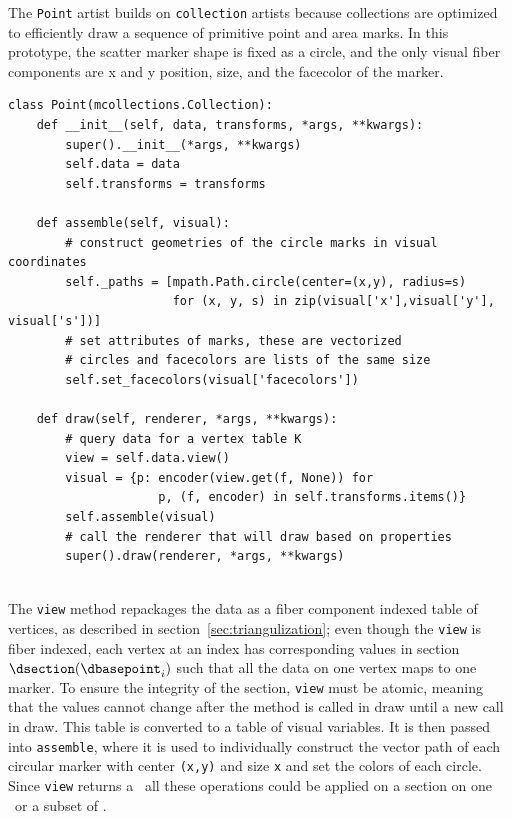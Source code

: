 \documentclass[../main.tex]{subfiles}
\begin{document}
The \texttt{Point} artist builds on \texttt{collection} artists because collections are optimized to efficiently draw a sequence of primitive point and area marks. In this prototype, the scatter marker shape is fixed as a circle, and the only visual fiber components are x and y position, size, and the facecolor of the marker. 
\begin{verbatim}
class Point(mcollections.Collection):
    def __init__(self, data, transforms, *args, **kwargs):
        super().__init__(*args, **kwargs)
        self.data = data
        self.transforms = transforms

    def assemble(self, visual):
        # construct geometries of the circle marks in visual coordinates
        self._paths = [mpath.Path.circle(center=(x,y), radius=s) 
                       for (x, y, s) in zip(visual['x'],visual['y'], visual['s'])] 
        # set attributes of marks, these are vectorized 
        # circles and facecolors are lists of the same size
        self.set_facecolors(visual['facecolors'])
        
    def draw(self, renderer, *args, **kwargs):
        # query data for a vertex table K
        view = self.data.view() 
        visual = {p: encoder(view.get(f, None)) for 
                     p, (f, encoder) in self.transforms.items()}
        self.assemble(visual)
        # call the renderer that will draw based on properties
        super().draw(renderer, *args, **kwargs)
   
\end{verbatim} 
The \texttt{view} method repackages the data as a fiber component indexed table of vertices, as described in section~\ref{sec:triangulization}; even though the \texttt{view} is fiber indexed, each vertex at an index \dbasepoint has corresponding values in section $\dsection(\dbasepoint_{i})$ such that all the data on one vertex maps to one marker. To ensure the integrity of the section, \texttt{view} must be atomic, meaning that the values cannot change after the method is called in draw until a new call in draw. This table is converted to a table of visual variables. It is then passed into \texttt{assemble}, where it is used to individually construct the vector path of each circular marker with center \texttt{(x,y)} and size \texttt{x} and set the colors of each circle. Since \texttt{view} returns a \dsection\, all these operations could be applied on a section on one \dbasepoint\ or a subset of \dbase.
\end{document}

